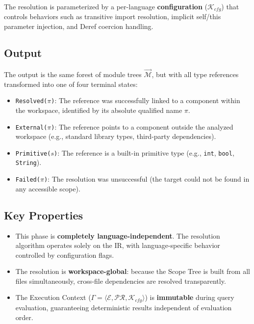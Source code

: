The resolution is parameterized by a per-language
\textbf{configuration} ($\mathcal{K}_{cfg}$) that controls behaviors
such as transitive import resolution, implicit self/this parameter
injection, and Deref coercion handling.

\subsection{Output}

The output is the same forest of module trees $\vec{\mathcal{M}}$,
but with all type references transformed into one of four terminal states:

\begin{itemize}
  \item \texttt{Resolved($\pi$)}: The reference was successfully
    linked to a component within the workspace, identified by its
    absolute qualified name $\pi$.
  \item \texttt{External($\pi$)}: The reference points to a component
    outside the analyzed workspace (e.g., standard library types,
    third-party dependencies).
  \item \texttt{Primitive($s$)}: The reference is a built-in
    primitive type (e.g., \texttt{int}, \texttt{bool}, \texttt{String}).
  \item \texttt{Failed($\pi$)}: The resolution was unsuccessful (the
    target could not be found in any accessible scope).
\end{itemize}

\subsection{Key Properties}
\begin{itemize}
  \item This phase is \textbf{completely language-independent}. The
    resolution algorithm operates solely on the IR, with
    language-specific behavior controlled by configuration flags.
  \item The resolution is \textbf{workspace-global}: because the
    Scope Tree is built from all files simultaneously, cross-file
    dependencies are resolved transparently.
  \item The Execution Context ($\Gamma = \langle \mathcal{E},
    \mathcal{PR}, \mathcal{K}_{cfg} \rangle$) is \textbf{immutable}
    during query evaluation, guaranteeing deterministic results
    independent of evaluation order.
\end{itemize}

